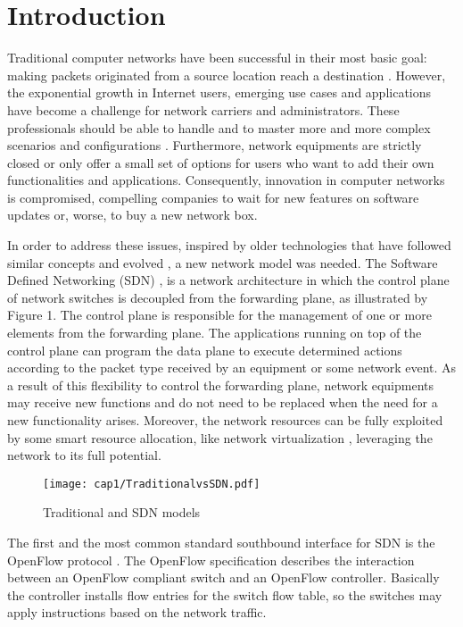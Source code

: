 \chapter{Introduction}
\label{cap:intro}

Traditional computer networks have been successful in their most basic goal: making packets originated from a source location reach a destination \cite{Shenker95fundamentaldesign}. However, the exponential growth in Internet users, emerging use cases and applications have become a challenge for network carriers and administrators. These professionals should be able to handle and to master more and more complex scenarios and configurations \cite{Feldmann:2007:ICD:1273445.1273453}. Furthermore, network equipments are strictly closed or only offer a small set of options for users who want to add their own functionalities and applications. Consequently, innovation in computer networks is compromised, compelling companies to wait for new features on software updates or, worse, to buy a new network box. 

In order to address these issues, inspired by older technologies that have followed similar concepts and evolved \cite{Feamster:2014:RSI:2602204.2602219}, a new network model was needed. The Software Defined Networking (SDN) \cite{DBLP:journals/corr/KreutzRVRAU14}, is a network architecture in which the control plane of network switches is decoupled from the forwarding plane, as illustrated by Figure 1. The control plane is responsible for the management of one or more elements from the forwarding plane. The applications running on top of the control plane can program the data plane to execute determined actions according to the packet type received by an equipment or some network event.  As a result of this flexibility to control the forwarding plane, network equipments may receive new functions and do not need to be replaced when the need for a new functionality arises. Moreover, the network resources can be fully exploited by some smart resource allocation, like network virtualization \cite{FLOWVISOR} \cite{Al-Shabibi:2014:OMY:2620728.2620741}, leveraging the network to its full potential.

\begin{figure}[h!]
\centering
\texttt{[image: cap1/TraditionalvsSDN.pdf]}
\caption{Traditional and SDN models}
\label{fig:traditional_vs_sdn}
\end{figure}
    
The first and the most common standard southbound interface for SDN is the OpenFlow protocol \cite{McKeown:2008:OEI:1355734.1355746} \cite{2012onf_sdn}. The OpenFlow specification describes the interaction between an OpenFlow compliant switch and an OpenFlow controller. Basically the controller installs flow entries for the   switch flow table, so the switches may apply instructions based on the network traffic.


